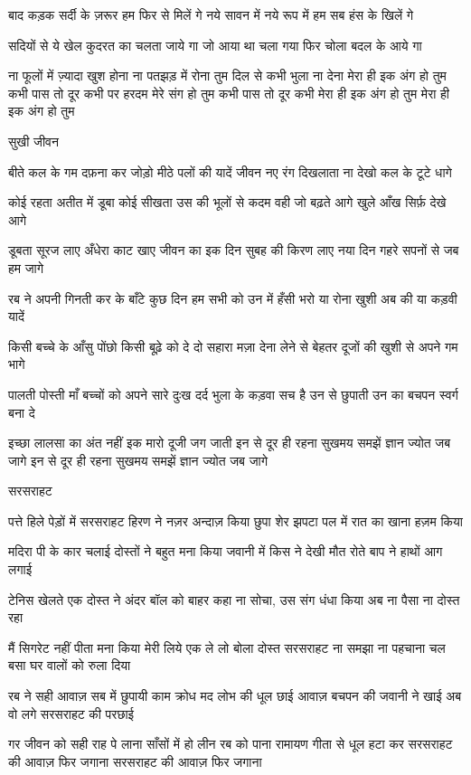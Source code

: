 बाद कड़क सर्दी के ज़रूर
हम फिर से मिलें गे
नये सावन में नये रूप में
हम सब हंस के खिलें गे

सदियों से ये खेल कुदरत का
चलता जाये गा
जो आया था चला गया
फिर चोला बदल के आये गा


ना फूलों में ज़्यादा खुश होना
ना पतझड़ में रोना तुम
दिल से कभी भुला ना देना
मेरा ही इक अंग हो तुम
कभी पास तो दूर कभी
पर हरदम मेरे संग हो तुम
कभी पास तो दूर कभी
मेरा ही इक अंग हो तुम
मेरा ही इक अंग हो तुम

सुखी जीवन

बीते कल के गम दफ़ना कर
जोड़ो मीठे पलों की यादें
जीवन नए रंग दिखलाता
ना देखो कल के टूटे धागे





कोई रहता अतीत में डूबा
कोई सीखता उस की भूलों से
कदम वही जो बढ़ते आगे
खुले आँख सिर्फ़ देखे आगे

डूबता सूरज लाए अँधेरा
काट खाए जीवन का इक दिन
सुबह की किरण लाए नया दिन
गहरे सपनों से जब हम जागे


रब ने अपनी गिनती कर के
बाँटे कुछ दिन हम सभी को
उन में हँसी भरो या रोना
खुशी अब की या कड़वी यादें

किसी बच्चे के आँसु पोंछो
किसी बूढ़े को दे दो सहारा
मज़ा देना लेने से बेहतर
दूजों की खुशी से अपने गम भागे


पालती पोस्ती माँ बच्चों को
 अपने सारे दुःख दर्द भुला के
कड़वा सच है उन से छुपाती
उन का बचपन स्वर्ग बना दे

इच्छा लालसा का अंत नहीं
इक मारो दूजी जग जाती
इन से दूर ही रहना सुखमय
समझें ज्ञान ज्योत जब जागे
इन से दूर ही रहना सुखमय
समझें ज्ञान ज्योत जब जागे

सरसराहट

पत्ते हिले पेड़ों में सरसराहट
हिरण ने नज़र अन्दाज़ किया
छुपा शेर झपटा पल में
रात का खाना हज़म किया





मदिरा पी के कार चलाई
दोस्तों ने बहुत मना किया
जवानी में किस ने देखी मौत
रोते बाप ने हाथों आग लगाई

टेनिस खेलते एक दोस्त ने
अंदर बॉल को बाहर कहा
ना सोचा, उस संग धंधा किया
अब ना पैसा ना दोस्त रहा

मैं सिगरेट नहीं पीता मना किया
मेरी लिये एक ले लो बोला दोस्त
सरसराहट ना समझा ना पहचाना
चल बसा घर वालों को रुला दिया

रब ने सही आवाज़ सब में छुपायी
काम क्रोध मद लोभ की धूल छाई
आवाज़ बचपन की जवानी ने खाई
अब वो लगे सरसराहट की परछाई

गर जीवन को सही राह पे लाना
साँसों में हो लीन रब को पाना
रामायण गीता से धूल हटा कर
सरसराहट की आवाज़ फिर जगाना
सरसराहट की आवाज़ फिर जगाना


